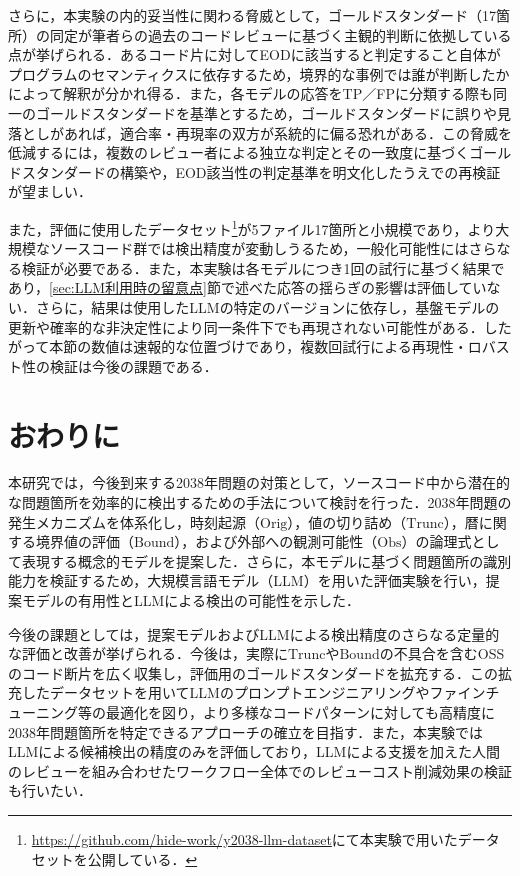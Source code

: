 \documentclass[submit,techrep,noauthor]{ipsj}
\begin{document}
さらに，本実験の内的妥当性に関わる脅威として，ゴールドスタンダード（17箇所）の同定が筆者らの過去のコードレビューに基づく主観的判断に依拠している点が挙げられる．あるコード片に対してEODに該当すると判定すること自体がプログラムのセマンティクスに依存するため，境界的な事例では誰が判断したかによって解釈が分かれ得る．また，各モデルの応答をTP／FPに分類する際も同一のゴールドスタンダードを基準とするため，ゴールドスタンダードに誤りや見落としがあれば，適合率・再現率の双方が系統的に偏る恐れがある．この脅威を低減するには，複数のレビュー者による独立な判定とその一致度に基づくゴールドスタンダードの構築や，EOD該当性の判定基準を明文化したうえでの再検証が望ましい．

また，評価に使用したデータセット\footnote{\url{https://github.com/hide-work/y2038-llm-dataset}にて本実験で用いたデータセットを公開している．}が5ファイル17箇所と小規模であり，より大規模なソースコード群では検出精度が変動しうるため，一般化可能性にはさらなる検証が必要である．また，本実験は各モデルにつき1回の試行に基づく結果であり，\ref{sec:LLM利用時の留意点}節で述べた応答の揺らぎの影響は評価していない．さらに，結果は使用したLLMの特定のバージョンに依存し，基盤モデルの更新や確率的な非決定性により同一条件下でも再現されない可能性がある．したがって本節の数値は速報的な位置づけであり，複数回試行による再現性・ロバスト性の検証は今後の課題である．

\section{おわりに}

本研究では，今後到来する2038年問題の対策として，ソースコード中から潜在的な問題箇所を効率的に検出するための手法について検討を行った．2038年問題の発生メカニズムを体系化し，時刻起源（$\mathrm{Orig}$），値の切り詰め（$\mathrm{Trunc}$），暦に関する境界値の評価（$\mathrm{Bound}$），および外部への観測可能性（$\mathrm{Obs}$）の論理式として表現する概念的モデルを提案した．さらに，本モデルに基づく問題箇所の識別能力を検証するため，大規模言語モデル（LLM）を用いた評価実験を行い，提案モデルの有用性とLLMによる検出の可能性を示した．

今後の課題としては，提案モデルおよびLLMによる検出精度のさらなる定量的な評価と改善が挙げられる．今後は，実際に$\mathrm{Trunc}$や$\mathrm{Bound}$の不具合を含むOSSのコード断片を広く収集し，評価用のゴールドスタンダードを拡充する．この拡充したデータセットを用いてLLMのプロンプトエンジニアリングやファインチューニング等の最適化を図り，より多様なコードパターンに対しても高精度に2038年問題箇所を特定できるアプローチの確立を目指す．また，本実験ではLLMによる候補検出の精度のみを評価しており，LLMによる支援を加えた人間のレビューを組み合わせたワークフロー全体でのレビューコスト削減効果の検証も行いたい．
\end{document}
